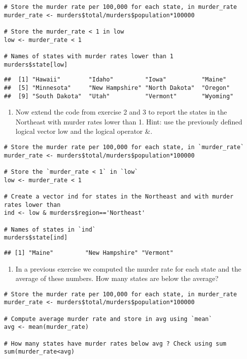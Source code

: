 \documentclass[
]{article}
\providecommand{\tightlist}{%
  \setlength{\itemsep}{0pt}\setlength{\parskip}{0pt}}
\begin{document}
\begin{verbatim}
# Store the murder rate per 100,000 for each state, in murder_rate
murder_rate <- murders$total/murders$population*100000

# Store the murder_rate < 1 in low 
low <- murder_rate < 1

# Names of states with murder rates lower than 1
murders$state[low]
\end{verbatim}

\begin{verbatim}
##  [1] "Hawaii"        "Idaho"         "Iowa"          "Maine"        
##  [5] "Minnesota"     "New Hampshire" "North Dakota"  "Oregon"       
##  [9] "South Dakota"  "Utah"          "Vermont"       "Wyoming"
\end{verbatim}

\begin{enumerate}
\def\labelenumi{\arabic{enumi}.}
\setcounter{enumi}{3}
\tightlist
\item
  Now extend the code from exercise 2 and 3 to report the states in the
  Northeast with murder rates lower than 1. Hint: use the previously
  defined logical vector low and the logical operator \&.
\end{enumerate}

\begin{verbatim}
# Store the murder rate per 100,000 for each state, in `murder_rate`
murder_rate <- murders$total/murders$population*100000

# Store the `murder_rate < 1` in `low` 
low <- murder_rate < 1

# Create a vector ind for states in the Northeast and with murder rates lower than
ind <- low & murders$region=='Northeast'

# Names of states in `ind` 
murders$state[ind] 
\end{verbatim}

\begin{verbatim}
## [1] "Maine"         "New Hampshire" "Vermont"
\end{verbatim}

\begin{enumerate}
\def\labelenumi{\arabic{enumi}.}
\setcounter{enumi}{4}
\tightlist
\item
  In a previous exercise we computed the murder rate for each state and
  the average of these numbers. How many states are below the average?
\end{enumerate}

\begin{verbatim}
# Store the murder rate per 100,000 for each state, in murder_rate
murder_rate <- murders$total/murders$population*100000

# Compute average murder rate and store in avg using `mean` 
avg <- mean(murder_rate)

# How many states have murder rates below avg ? Check using sum 
sum(murder_rate<avg)
\end{verbatim}
\end{document}
